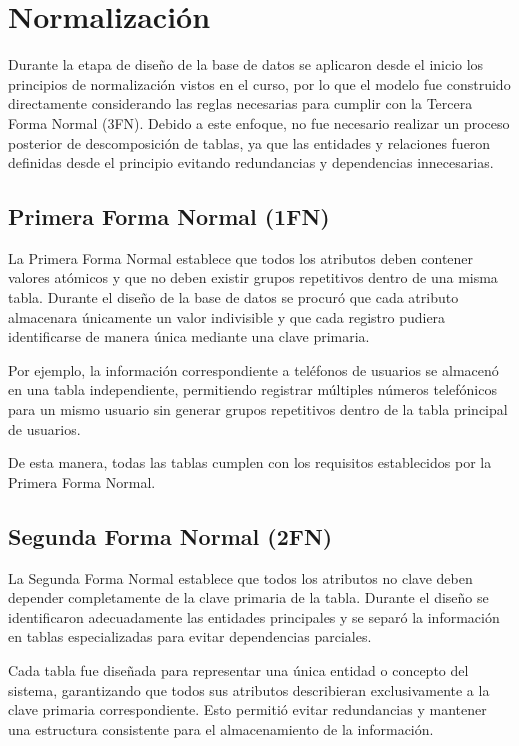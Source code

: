 \section{Normalización}

Durante la etapa de diseño de la base de datos se aplicaron desde el inicio los principios de normalización vistos en el curso, por lo que el modelo fue construido directamente considerando las reglas necesarias para cumplir con la Tercera Forma Normal (3FN). Debido a este enfoque, no fue necesario realizar un proceso posterior de descomposición de tablas, ya que las entidades y relaciones fueron definidas desde el principio evitando redundancias y dependencias innecesarias.

\subsection{Primera Forma Normal (1FN)}

La Primera Forma Normal establece que todos los atributos deben contener valores atómicos y que no deben existir grupos repetitivos dentro de una misma tabla. Durante el diseño de la base de datos se procuró que cada atributo almacenara únicamente un valor indivisible y que cada registro pudiera identificarse de manera única mediante una clave primaria.

Por ejemplo, la información correspondiente a teléfonos de usuarios se almacenó en una tabla independiente, permitiendo registrar múltiples números telefónicos para un mismo usuario sin generar grupos repetitivos dentro de la tabla principal de usuarios.

De esta manera, todas las tablas cumplen con los requisitos establecidos por la Primera Forma Normal.

\subsection{Segunda Forma Normal (2FN)}

La Segunda Forma Normal establece que todos los atributos no clave deben depender completamente de la clave primaria de la tabla. Durante el diseño se identificaron adecuadamente las entidades principales y se separó la información en tablas especializadas para evitar dependencias parciales.

Cada tabla fue diseñada para representar una única entidad o concepto del sistema, garantizando que todos sus atributos describieran exclusivamente a la clave primaria correspondiente. Esto permitió evitar redundancias y mantener una estructura consistente para el almacenamiento de la información.

